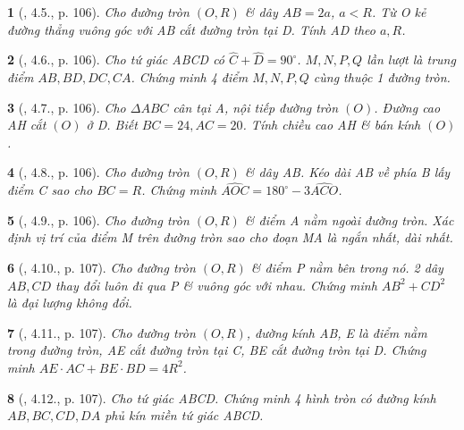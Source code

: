 \documentclass{article}
\newtheorem{baitoan}{}
\begin{document}
\begin{baitoan}[\cite{Binh_boi_duong_Toan_9_tap_1}, 4.5., p. 106]
	Cho đường tròn $(O,R)$ \& dây $AB = 2a$, $a < R$. Từ O kẻ đường thẳng vuông góc với AB cắt đường tròn tại D. Tính AD theo $a,R$.
\end{baitoan}

\begin{baitoan}[\cite{Binh_boi_duong_Toan_9_tap_1}, 4.6., p. 106]
	Cho tứ giác ABCD có $\widehat{C} + \widehat{D} = 90^\circ$. $M,N,P,Q$ lần lượt là trung điểm $AB,BD,DC,CA$. Chứng minh 4 điểm $M,N,P,Q$ cùng thuộc 1 đường tròn.
\end{baitoan}

\begin{baitoan}[\cite{Binh_boi_duong_Toan_9_tap_1}, 4.7., p. 106]
	Cho $\Delta ABC$ cân tại A, nội tiếp đường tròn $(O)$. Đường cao AH cắt $(O)$ ở D. Biết $BC = 24,AC = 20$. Tính chiều cao AH \& bán kính $(O)$.
\end{baitoan}

\begin{baitoan}[\cite{Binh_boi_duong_Toan_9_tap_1}, 4.8., p. 106]
	Cho đường tròn $(O,R)$ \& dây AB. Kéo dài AB về phía B lấy điểm C sao cho $BC = R$. Chứng minh $\widehat{AOC} = 180^\circ - 3\widehat{ACO}$.
\end{baitoan}

\begin{baitoan}[\cite{Binh_boi_duong_Toan_9_tap_1}, 4.9., p. 106]
	Cho đường tròn $(O,R)$ \& điểm A nằm ngoài đường tròn. Xác định vị trí của điểm M trên đường tròn sao cho đoạn MA là ngắn nhất, dài nhất.
\end{baitoan}

\begin{baitoan}[\cite{Binh_boi_duong_Toan_9_tap_1}, 4.10., p. 107]
	Cho đường tròn $(O,R)$ \& điểm P nằm bên trong nó. 2 dây $AB,CD$ thay đổi luôn đi qua P \& vuông góc với nhau. Chứng minh $AB^2 + CD^2$ là đại lượng không đổi.
\end{baitoan}

\begin{baitoan}[\cite{Binh_boi_duong_Toan_9_tap_1}, 4.11., p. 107]
	Cho đường tròn $(O,R)$, đường kính AB, E là điểm nằm trong đường tròn, AE cắt đường tròn tại C, BE cắt đường tròn tại D. Chứng minh $AE\cdot AC + BE\cdot BD = 4R^2$.
\end{baitoan}

\begin{baitoan}[\cite{Binh_boi_duong_Toan_9_tap_1}, 4.12., p. 107]
	Cho tứ giác ABCD. Chứng minh 4 hình tròn có đường kính $AB,BC,CD,DA$ phủ kín miền tứ giác ABCD.
\end{baitoan}
\end{document}
